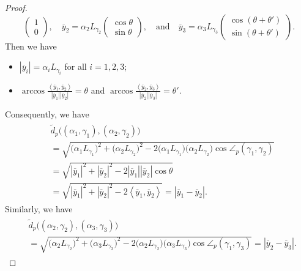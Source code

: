 \documentclass[10pt,a4paper]{amsart}
\def\R{\mathbb R}
\providecommand{\abs}[1]{\left\lvert#1\right\rvert}
\newcommand{\ip}[2]{\left\langle #1, #2 \right\rangle}
\begin{document}
\begin{proof}
\[\begin{pmatrix}
   1 \\
   0
  \end{pmatrix}, 
  \quad 
  \overline{y}_2 = 
  \alpha_2 L_{\gamma_2}
  \begin{pmatrix}
   \cos \theta  \\
   \sin \theta 
  \end{pmatrix}, 
  \quad \textrm{and} \quad 
  \overline{y}_3 = 
   \alpha_3 L_{\gamma_3}
   \begin{pmatrix}
   \cos (\theta + \theta') \\
   \sin (\theta + \theta')
  \end{pmatrix}. 
 \] 
 Then we have
 \begin{itemize}
  \item $\abs{\overline{y}_i} = \alpha_i L_{\gamma_i}$ 
 for all $i=1,2,3$; 
  \item $\arccos \frac{\ip{\overline{y}_1}{\overline{y}_2}}
 {\abs{\overline{y}_1}\abs{\overline{y}_2}} = \theta$ 
 and $\arccos \frac{\ip{\overline{y}_2}{\overline{y}_3}}
 {\abs{\overline{y}_2}\abs{\overline{y}_3}} = \theta'$. 
 \end{itemize}
 Consequently, we have 
 \begin{align}
  \begin{split}\label{eq:d_p-pm-a}
  &\tilde{d}_p\bigl((\alpha_1, \gamma_1), (\alpha_2, \gamma_2)\bigr) \\
  &= \sqrt{\bigl(\alpha_1 L_{\gamma_1}\bigr)^2 
 +\bigl(\alpha_2 L_{\gamma_2}\bigr)^2 
 -2\bigl(\alpha_1 L_{\gamma_1}\bigr)
 \bigl(\alpha_2 L_{\gamma_2}\bigr)\cos \angle_p(\gamma_1, \gamma_2)} \\
  &= \sqrt{\abs{\overline{y}_1}^2 + \abs{\overline{y}_2}^2 
 -2\abs{\overline{y}_1}\abs{\overline{y}_2}
 \cos \theta} \\
  &= \sqrt{\abs{\overline{y}_1}^2 + \abs{\overline{y}_2}^2 
 -2\ip{\overline{y}_1}{\overline{y}_2}} 
  =\abs{\overline{y}_1-\overline{y}_2}. 
  \end{split}
 \end{align}
 Similarly, we have 
 \begin{align}
  \begin{split}\label{eq:d_p-pm-b}
  &\tilde{d}_p\bigl((\alpha_2, \gamma_2), (\alpha_3, \gamma_3)\bigr) \\
  &= \sqrt{\bigl(\alpha_2 L_{\gamma_2}\bigr)^2 
    +\bigl(\alpha_3 L_{\gamma_3}\bigr)^2 
 -2\bigl(\alpha_2 L_{\gamma_2}\bigr)
 \bigl(\alpha_3 L_{\gamma_3}\bigr)\cos \angle_p(\gamma_1, \gamma_3)} 
  = \abs{\overline{y}_2-\overline{y}_3}.       
  \end{split}
 \end{align}


\end{proof}
\end{document}
